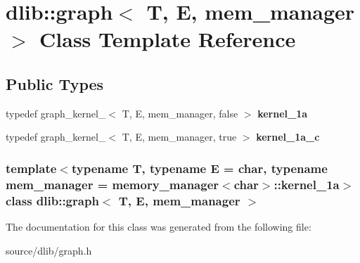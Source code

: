 \hypertarget{classdlib_1_1graph}{
\section{dlib::graph$<$ T, E, mem\_\-manager $>$ Class Template Reference}
\label{classdlib_1_1graph}
}
\subsection*{Public Types}
\begin{DoxyCompactItemize}
\item 
\hypertarget{classdlib_1_1graph_a1c448d65146aa8241a2ad6ce8c053b3c}{
typedef graph\_\-kernel\_$<$ T, E, mem\_\-manager, false $>$ {\bfseries kernel\_\-1a}}
\label{classdlib_1_1graph_a1c448d65146aa8241a2ad6ce8c053b3c}

\item 
\hypertarget{classdlib_1_1graph_a271111ff39faae17c5ffd8547db3902f}{
typedef graph\_\-kernel\_$<$ T, E, mem\_\-manager, true $>$ {\bfseries kernel\_\-1a\_\-c}}
\label{classdlib_1_1graph_a271111ff39faae17c5ffd8547db3902f}

\end{DoxyCompactItemize}
\subsubsection*{template$<$typename T, typename E = char, typename mem\_\-manager = memory\_\-manager$<$char$>$::kernel\_\-1a$>$ class dlib::graph$<$ T, E, mem\_\-manager $>$}



The documentation for this class was generated from the following file:\begin{DoxyCompactItemize}
\item 
source/dlib/graph.h\end{DoxyCompactItemize}
